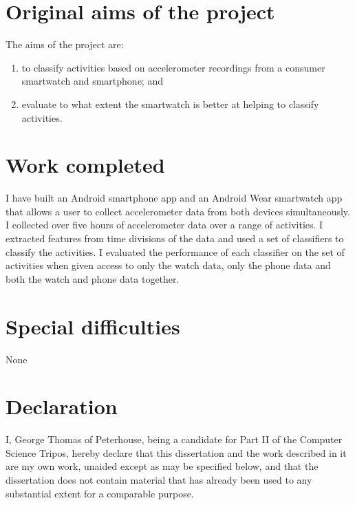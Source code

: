 \documentclass[12pt,a4paper,twoside,openright]{report}
\begin{document}
\section*{Original aims of the project}

  The aims of the project are:
  \begin{enumerate}
    \item to classify activities based on accelerometer recordings from a consumer smartwatch and smartphone; and
    \item evaluate to what extent the smartwatch is better at helping to classify activities.
  \end{enumerate}

\section*{Work completed}

  I have built an Android smartphone app and an Android Wear smartwatch app that allows a user to collect accelerometer data from both devices simultaneously. I collected over five hours of accelerometer data over a range of activities. I extracted features from time divisions of the data and used a set of classifiers to classify the activities. I evaluated the performance of each classifier on the set of activities when given access to only the watch data, only the phone data and both the watch and phone data together.

\section*{Special difficulties}

None

\restoregeometry
\newpage

\section*{Declaration}

I, George Thomas of Peterhouse, being a candidate for Part II of the Computer
Science Tripos, hereby declare
that this dissertation and the work described in it are my own work,
unaided except as may be specified below, and that the dissertation
does not contain material that has already been used to any substantial
extent for a comparable purpose.

\bigskip
{}

\medskip
{}
\end{document}
